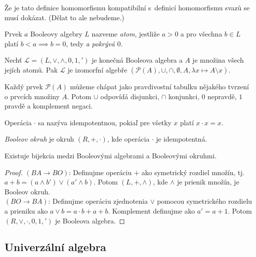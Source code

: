 Že je tato definice homomorfismu kompatibilní s~definicí homomorfismu
svazů se musí dokázat. (Dělat to ale nebudeme.)

\begin{definition}[Atom]
    Prvek $a$ Booleovy algebry $L$ nazveme {\em atom}, jestliže
    $a > 0$ a pro všechna $b \in L$ platí $b < a \implies b = 0$,
    tedy {\em a pokrývá $0$}.
\end{definition}

\begin{theorem}
    Nechť $\mathcal{L} = (L, \vee, \wedge, 0, 1, {'})$
    je konečná Booleova algebra
    \linebreak
    a $A$ je množina všech jejích atomů.
    Pak $\mathcal{L}$ je izomorfní algebře
    \linebreak
    $(\mathcal{P}(A), \cup, \cap, \emptyset, A, \lambda x \mapsto A \setminus x)$.
\end{theorem}

Každý prvek $\mathcal{P}(A)$ můžeme chápat jako pravdivostní tabulku
nějakého tvrzení o prvcích množiny $A$. Potom $\cup$ odpovídá
disjunkci, $\cap$ konjunkci, $0$ nepravdě, $1$ pravdě a komplement
negaci.

Operácia $\cdot$ sa nazýva idempotentnou, pokiaľ pre všetky $x$ platí
$x \cdot x = x$.	

\begin{definition}
    {\em Booleov okruh} je okruh $(R,+,\cdot)$, kde operácia $\cdot$ 
	je idempotentná.
\end{definition}

\begin{theorem}
    Existuje bijekcia medzi Booleovými algebrami a Booleovými okruhmi.
\end{theorem}
\begin{proof}
	$(BA \to BO)$: Definujme operáciu $+$ ako symetrický rozdiel množín,
	tj. $a+b=(a \land b') \lor (a' \land b)$. Potom $(L, +, \land)$, kde
	$\land$ je prienik množín, je Booleov okruh.\\
	$(BO \to BA)$: Definujme operáciu zjednotenia $\lor$ pomocou symetrického
	rozdielu a prieniku ako $a \lor b = a \cdot b + a + b$. Komplement definujme
	ako $a'=a+1$. Potom $(R, \lor, \cdot, 0, 1, ')$ je Booleova algebra.
\end{proof}

\subsection{Univerzální algebra}

